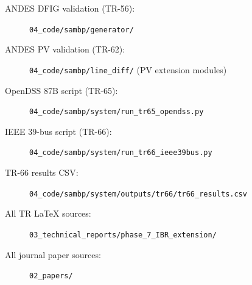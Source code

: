 \documentclass[12pt,a4paper]{article}
\begin{document}
\begin{description}
  \item[ANDES DFIG validation (TR-56):] \texttt{04\_code/sambp/generator/}
  \item[ANDES PV validation (TR-62):]   \texttt{04\_code/sambp/line\_diff/} (PV extension modules)
  \item[OpenDSS 87B script (TR-65):]    \texttt{04\_code/sambp/system/run\_tr65\_opendss.py}
  \item[IEEE 39-bus script (TR-66):]    \texttt{04\_code/sambp/system/run\_tr66\_ieee39bus.py}
  \item[TR-66 results CSV:]             \texttt{04\_code/sambp/system/outputs/tr66/tr66\_results.csv}
  \item[All TR LaTeX sources:]          \texttt{03\_technical\_reports/phase\_7\_IBR\_extension/}
  \item[All journal paper sources:]     \texttt{02\_papers/}
\end{description}
\end{document}
